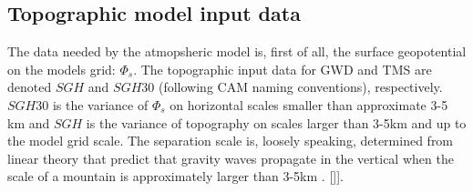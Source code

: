 \documentclass[gmd]{copernicus}
\begin{document}
\subsection{Topographic model input data}
The data needed by the atmopsheric model is, first of all, the surface geopotential on the models grid: $\Phi_s$. The topographic input data for GWD and TMS are denoted $SGH$ and $SGH30$ (following CAM naming conventions), respectively. $SGH30$ is the variance of $\Phi_s$ on horizontal scales smaller than approximate 3-5 km and $SGH$ is the variance of topography on scales larger than 3-5km and up to the model grid scale. The separation scale is, loosely speaking, determined from linear theory that predict that gravity waves propagate in the vertical when the scale of a mountain is approximately larger than 3-5km \citep[e.g.,][]{Durran,BBW2004QJRMS}. 
[{\color{red}{we could consider showing some results - especially since CAM5.4/5 is using the new topo}}]].


{\color{red}{Julio: please describe input data of ridges ...}}
\end{document}
